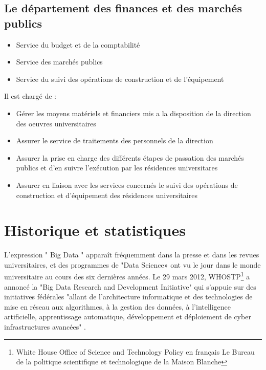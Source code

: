 \subsection{Le département des finances et des marchés publics}
    \begin{itemize}
        \item Service du budget et de la comptabilité
        \item Service des marchés publics
        \item Service du suivi des opérations de construction et de l'équipement\\
    \end{itemize}

    Il est chargé de :
    \begin{itemize}
        \item Gérer les moyens matériels et financiers mis a la disposition de la direction des oeuvres universitaires
        \item Assurer le service de traitements des personnels de la direction
        \item Assurer la prise en charge des différents étapes de passation des marchés publics et d'en suivre l'exécution par les résidences universitares
        \item Assurer en liaison avec les services concernés le suivi des  opérations de construction et d'équipement des résidences universitaires
    \end{itemize}

\section{Historique et  statistiques}
\leftskip=1cm

L'expression " Big Data " apparaît fréquemment dans la presse et dans les revues universitaires, et des programmes de "Data Science» ont vu le jour dans le monde universitaire au cours des six dernières années. Le 29 mars 2012, WHOSTP\footnote{White House Office of Science and Technology Policy en français Le Bureau de la politique scientifique et technologique de la Maison Blanche} a annoncé la "Big Data Research and Development Initiative" qui s'appuie sur des initiatives fédérales "allant de l'architecture informatique et des technologies de mise en réseau aux algorithmes, à la gestion des données, à l'intelligence artificielle, apprentissage automatique, développement et déploiement de cyber infrastructures avancées"  \cite{ridgeway2018policing}.\\

